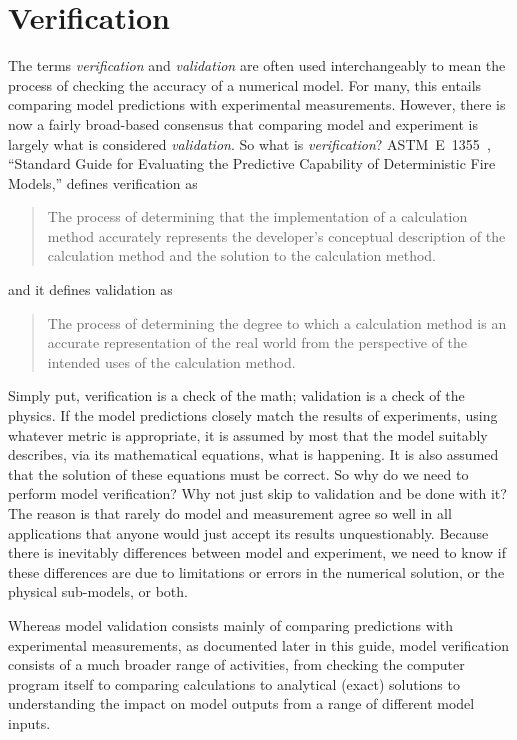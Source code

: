 
\chapter{Verification}

The terms {\em verification} and {\em validation} are often used interchangeably to mean the process of checking the accuracy of a numerical model. For many, this entails comparing model predictions with experimental measurements. However, there is now a fairly broad-based consensus that comparing model and experiment is largely what is considered {\em validation}. So what is {\em verification}? ASTM~E~1355~\cite{ASTM:E1355}, ``Standard Guide for Evaluating the Predictive Capability of Deterministic Fire Models,'' defines verification as
\begin{quote}
The process of determining that the implementation of a calculation method accurately represents the developer's conceptual description of the calculation method and the solution to the calculation method.
\end{quote}
and it defines validation as
\begin{quote}
The process of determining the degree to which a calculation method is an accurate representation of the real world from the perspective of the intended uses of the calculation method.
\end{quote}
Simply put, verification is a check of the math; validation is a check of the physics. If the model predictions closely match the results of experiments, using whatever metric is appropriate, it is assumed by most that the model suitably describes, via its mathematical equations, what is happening. It is also assumed that the solution of these equations must be correct. So why do we need to perform model verification? Why not just skip to validation and be done with it? The reason is that rarely do model and measurement agree so well in all applications that anyone would just accept its results unquestionably. Because there is inevitably differences between model and experiment, we need to know if these differences are due to limitations or errors in the numerical solution, or the physical sub-models, or both.

Whereas model validation consists mainly of comparing predictions with experimental measurements, as documented later in this guide, model verification consists of a much broader range of activities, from checking the computer program itself to comparing calculations to analytical (exact) solutions to understanding the impact on model outputs from a range of different model inputs.


